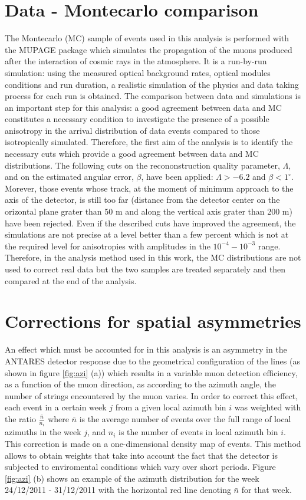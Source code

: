 \documentclass[a4paper]{jpconf}
\begin{document}
\section{Data - Montecarlo comparison}
The Montecarlo (MC) sample of events used in this analysis is performed with the MUPAGE \cite{mupage} package which simulates the propagation of the muons produced after the interaction of cosmic rays in the atmosphere. It is a run-by-run simulation: using the measured optical background rates, optical modules conditions and run duration, a realistic simulation of the physics and data taking process for each run is obtained. The comparison between data and simulations is an important step for this analysis: a good agreement between data and MC constitutes a necessary condition to investigate the presence of a possible anisotropy in the arrival distribution of data events compared to those isotropically simulated. Therefore, the first aim of the analysis is to identify the necessary cuts which provide a good agreement between data and MC distributions. The following cuts on the recononstruction quality parameter, $\Lambda$, and on the estimated angular error, $\beta$, have been applied: $\Lambda > -6.2$ and $\beta < 1^{\circ}$. Morever, those events whose track, at the moment of minimum approach to the axis of the detector, is still too far (distance from the detector center on the orizontal plane grater than 50 m and along the vertical axis grater than 200 m) have been rejected. Even if the described cuts have improved the agreement, the simulations are not precise at a level better than a few percent which is not at the required level  for anisotropies with amplitudes in the $10^{-4} - 10^{-3}$ range. Therefore,  in the analysis method used in this work, the MC distributions are not used to correct real data but the two samples are treated separately and then compared at the end of the analysis.  

\section{Corrections for spatial asymmetries}
An effect which must be accounted for in this analysis is an asymmetry in the ANTARES detector response due to the geometrical configuration of the lines (as shown in figure \ref {fig:azi} (a)) which results in a variable muon detection efficiency, as a function of the muon direction, as according to the azimuth angle, the number of strings encountered by the muon varies. In order to correct this effect, each event in a certain week $j$ from a given local azimuth bin $i$ was weighted with the ratio $\frac{\bar{n}}{n_i}$ where $\bar{n}$ is the average number of events over the full range of local azimuths in the week $j$, and $n_i$ is the number of events in local azimuth bin $i$. This correction is made on a one-dimensional density map of events.
This method allows to obtain weights that take into account the fact that the detector is subjected to enviromental conditions which vary over short periods. 
Figure \ref {fig:azi} (b) shows an example of the azimuth distribution for the week 24/12/2011 - 31/12/2011 with the horizontal red line denoting $\bar{n}$ for that week.
\end{document}
